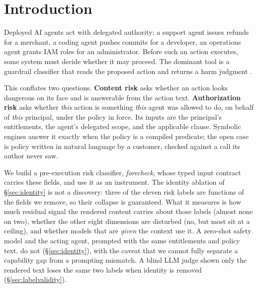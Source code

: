 \section{Introduction}
\label{sec:intro}

Deployed AI agents act with delegated authority: a support agent issues
refunds for a merchant, a coding agent pushes commits for a developer, an
operations agent grants IAM roles for an administrator. Before such an action
executes, some system must decide whether it may proceed. The dominant tool
is a guardrail classifier that reads the proposed action and returns a harm
judgment
\citep{inan2023llamaguard,padhi2024graniteguardian,zeng2024shieldgemma,ghosh2024aegis,openai2025gptosssafeguard}.

This conflates two questions. \textbf{Content risk} asks whether an action
looks dangerous on its face and is answerable from the action text.
\textbf{Authorization risk} asks whether \emph{this} action is something
\emph{this} agent was allowed to do, on behalf of \emph{this} principal,
under the policy in force. Its inputs are the principal's entitlements, the
agent's delegated scope, and the applicable clause. Symbolic engines
\citep{pang2019zanzibar,cutler2024cedar,oasis2013xacml} answer it exactly
when the policy is a compiled predicate; the open case is policy written in
natural language by a customer, checked against a call its author never saw.

We build a pre-execution risk classifier, \emph{forecheck}, whose typed input
contract carries these fields, and use it as an instrument. The identity
ablation of \S\ref{sec:identity} is not a discovery: three of the eleven
risk labels are functions of the fields we remove, so their collapse is
guaranteed. What it measures is how much residual signal the rendered
content carries about those labels (almost none on two), whether the other
eight dimensions are disturbed (no, but most sit at a ceiling), and whether
models that are \emph{given} the context use it. A zero-shot safety model
and the acting agent, prompted with the same entitlements and policy text,
do not (\S\ref{sec:identity}), with the caveat that we cannot fully
separate a capability gap from a prompting mismatch. A
blind LLM judge shown only the rendered text loses the same two labels when
identity is removed (\S\ref{sec:labelvalidity}).

